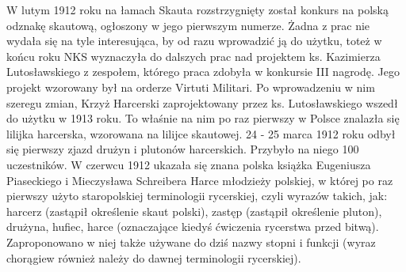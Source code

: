 W lutym 1912 roku na łamach Skauta rozstrzygnięty został konkurs na polską odznakę skautową, ogłoszony w jego pierwszym numerze. Żadna z prac nie wydała się na tyle interesująca, by od razu wprowadzić ją do użytku, toteż w końcu roku NKS wyznaczyła do dalszych prac nad projektem ks. Kazimierza Lutosławskiego z zespołem, którego praca zdobyła w konkursie III nagrodę. Jego projekt wzorowany był na orderze Virtuti Militari. Po wprowadzeniu w nim szeregu zmian, Krzyż Harcerski zaprojektowany przez ks. Lutosławskiego wszedł do użytku w 1913 roku. To właśnie na nim po raz pierwszy w Polsce znalazła się lilijka harcerska, wzorowana na lilijce skautowej. 24 - 25 marca 1912 roku odbył się pierwszy zjazd drużyn i plutonów harcerskich. Przybyło na niego 100 uczestników. W czerwcu 1912 ukazała się znana polska książka Eugeniusza Piaseckiego i Mieczysława Schreibera Harce młodzieży polskiej, w której po raz pierwszy użyto staropolskiej terminologii rycerskiej, czyli wyrazów takich, jak: harcerz (zastąpił określenie skaut polski), zastęp (zastąpił określenie pluton), drużyna, hufiec, harce (oznaczające kiedyś ćwiczenia rycerstwa przed bitwą). Zaproponowano w niej także używane do dziś nazwy stopni i funkcji (wyraz chorągiew również należy do dawnej terminologii rycerskiej).

